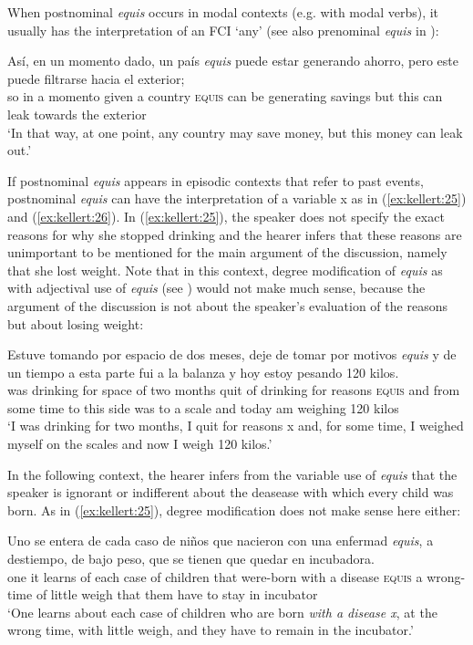 \documentclass[output=paper]{langsci/langscibook}
\begin{document}
When postnominal \textit{equis} occurs in modal contexts (e.g. with modal verbs), it usually has the interpretation of an FCI ‘any’ (see also prenominal \textit{equis} in ):

\ea\label{ex:kellert:24}
\gll  Así, en un momento dado, un país \textit{equis} puede estar generando ahorro, pero este puede filtrarse hacia el exterior;\\
so in a momento given a country \textsc{equis} can be generating savings but this can leak towards the exterior\\
\glt ‘In that way, at one point, any country may save money, but this money can leak out.’
\z

If postnominal \textit{equis} appears in episodic contexts that refer to past events, postnominal \textit{equis} can have the interpretation of a variable x as in (\ref{ex:kellert:25}) and (\ref{ex:kellert:26}). In (\ref{ex:kellert:25}), the speaker does not specify the exact reasons for why she stopped drinking and the hearer infers that these reasons are unimportant to be mentioned for the main argument of the discussion, namely that she lost weight. Note that in this context, degree modification of \textit{equis} as with adjectival use of \textit{equis} (see ) would not make much sense, because the argument of the discussion is not about the speaker's evaluation of the reasons but about losing weight:

\ea\label{ex:kellert:25}
\gll  Estuve tomando por espacio de dos meses, deje de tomar por motivos \textit{equis} y de un tiempo a esta parte fui a la balanza y hoy estoy pesando 120 kilos.\\
was drinking for space of two months quit of drinking for reasons \textsc{equis} and from some time to this side was to a scale and today am weighing 120 kilos\\
\glt ‘I was drinking for two months, I quit for reasons x and, for some time, I weighed myself on the scales and now I weigh 120 kilos.’
\z

In the following context, the hearer infers from the variable use of \textit{equis} that the speaker is ignorant or indifferent about the deasease with which every child was born. As in (\ref{ex:kellert:25}), degree modification does not make sense here either:

\ea\label{ex:kellert:26}
\gll  Uno se entera de cada caso de niños que nacieron con una enfermad \textit{equis}, a destiempo, de bajo peso, que se tienen que quedar en incubadora.\\
one it learns of each case of children that were-born with a disease \textsc{equis} a wrong-time of little weigh that them have to stay in incubator\\
\glt ‘One learns about each case of children who are born \textit{with a disease x}, at the wrong time, with little weigh, and they have to remain in the incubator.’
\z
\end{document}
